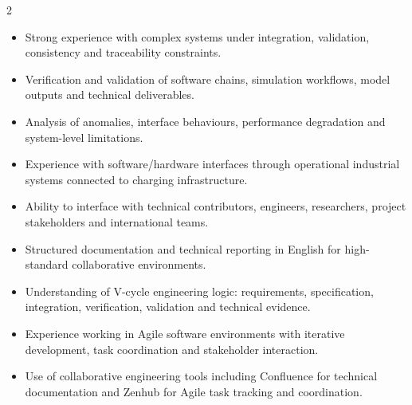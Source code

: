 \documentclass[8pt,a4paper,ragged2e,withhyper]{altacv}
\begin{document}
\begin{paracol}{2}
\begin{itemize}
  \item Strong experience with complex systems under integration, validation, consistency and traceability constraints.
  \item Verification and validation of software chains, simulation workflows, model outputs and technical deliverables.
  \item Analysis of anomalies, interface behaviours, performance degradation and system-level limitations.
  \item Experience with software/hardware interfaces through operational industrial systems connected to charging infrastructure.
  \item Ability to interface with technical contributors, engineers, researchers, project stakeholders and international teams.
  \item Structured documentation and technical reporting in English for high-standard collaborative environments.
\item Understanding of V-cycle engineering logic: requirements, specification, integration, verification, validation and technical evidence.
  \item Experience working in Agile software environments with iterative development, task coordination and stakeholder interaction.
  \item Use of collaborative engineering tools including Confluence for technical documentation and Zenhub for Agile task tracking and coordination.
\end{itemize}


\divider
{}
\divider

\medskip



\divider


\divider


\divider




\end{paracol}
\end{document}
